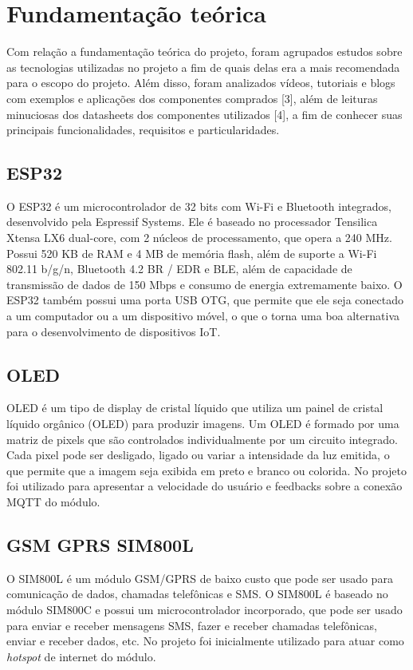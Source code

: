 \chapter{Fundamentação teórica}
Com relação a fundamentação teórica do projeto, foram agrupados estudos sobre as tecnologias utilizadas no projeto a fim de quais delas era a mais recomendada para o escopo do projeto. Além disso, foram analizados vídeos, tutoriais e blogs com exemplos e aplicações dos componentes comprados [3], além de leituras minuciosas dos datasheets dos componentes utilizados [4], a fim de conhecer suas principais funcionalidades, requisitos e particularidades.

\section{ESP32}
O ESP32 é um microcontrolador de 32 bits com Wi-Fi e Bluetooth integrados, desenvolvido pela Espressif Systems. Ele é baseado no processador Tensilica Xtensa LX6 dual-core, com 2 núcleos de processamento, que opera a 240 MHz. Possui 520 KB de RAM e 4 MB de memória flash, além de suporte a Wi-Fi 802.11 b/g/n, Bluetooth 4.2 BR / EDR e BLE, além de capacidade de transmissão de dados de 150 Mbps e consumo de energia extremamente baixo. O ESP32 também possui uma porta USB OTG, que permite que ele seja conectado a um computador ou a um dispositivo móvel, o que o torna uma boa alternativa para o desenvolvimento de dispositivos IoT.

\section{OLED}
OLED é um tipo de display de cristal líquido que utiliza um painel de cristal líquido orgânico (OLED) para produzir imagens. Um OLED é formado por uma matriz de pixels que são controlados individualmente por um circuito integrado. Cada pixel pode ser desligado, ligado ou variar a intensidade da luz emitida, o que permite que a imagem seja exibida em preto e branco ou colorida. No projeto foi utilizado para apresentar a velocidade do usuário e feedbacks sobre a conexão MQTT do módulo.

\section{GSM GPRS SIM800L}
O SIM800L é um módulo GSM/GPRS de baixo custo que pode ser usado para comunicação de dados, chamadas telefônicas e SMS. O SIM800L é baseado no módulo SIM800C e possui um microcontrolador incorporado, que pode ser usado para enviar e receber mensagens SMS, fazer e receber chamadas telefônicas, enviar e receber dados, etc. No projeto foi inicialmente utilizado para atuar como \textit{hotspot} de internet do módulo.

